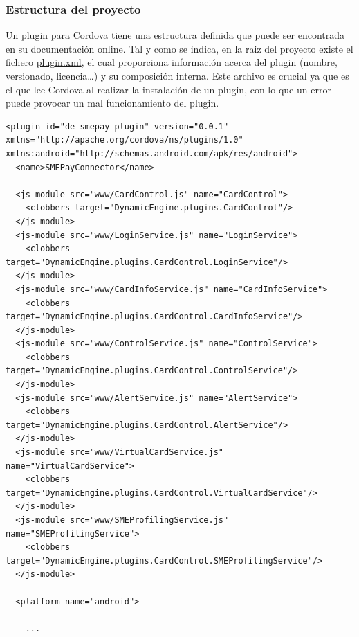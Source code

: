 \documentclass[a4paper, 12pt]{article}
\newenvironment{code}{\captionsetup{type=listing}}{}
\begin{document}
\subsubsection{Estructura del proyecto}
\label{sec-4-3-1}
Un plugin para Cordova tiene una estructura definida que puede ser encontrada en su documentación online\cite{Cordova}. Tal y como se indica, en la raiz del proyecto existe el fichero \hyperref[code:pluginxml]{plugin.xml},
el cual proporciona información acerca del plugin (nombre, versionado, licencia\ldots{}) y su composición interna. Este archivo es crucial ya que es el que lee Cordova al realizar la instalación de un plugin,
con lo que un error puede provocar un mal funcionamiento del plugin.
\begin{code}
\label{code:pluginxml}
\begin{verbatim}
<plugin id="de-smepay-plugin" version="0.0.1" xmlns="http://apache.org/cordova/ns/plugins/1.0" xmlns:android="http://schemas.android.com/apk/res/android">
  <name>SMEPayConnector</name>

  <js-module src="www/CardControl.js" name="CardControl">
    <clobbers target="DynamicEngine.plugins.CardControl"/>
  </js-module>
  <js-module src="www/LoginService.js" name="LoginService">
    <clobbers target="DynamicEngine.plugins.CardControl.LoginService"/>
  </js-module>
  <js-module src="www/CardInfoService.js" name="CardInfoService">
    <clobbers target="DynamicEngine.plugins.CardControl.CardInfoService"/>
  </js-module>
  <js-module src="www/ControlService.js" name="ControlService">
    <clobbers target="DynamicEngine.plugins.CardControl.ControlService"/>
  </js-module>
  <js-module src="www/AlertService.js" name="AlertService">
    <clobbers target="DynamicEngine.plugins.CardControl.AlertService"/>
  </js-module>
  <js-module src="www/VirtualCardService.js" name="VirtualCardService">
    <clobbers target="DynamicEngine.plugins.CardControl.VirtualCardService"/>
  </js-module>
  <js-module src="www/SMEProfilingService.js" name="SMEProfilingService">
    <clobbers target="DynamicEngine.plugins.CardControl.SMEProfilingService"/>
  </js-module>

  <platform name="android">

    ...


\end{verbatim}
\end{code}
\end{document}
